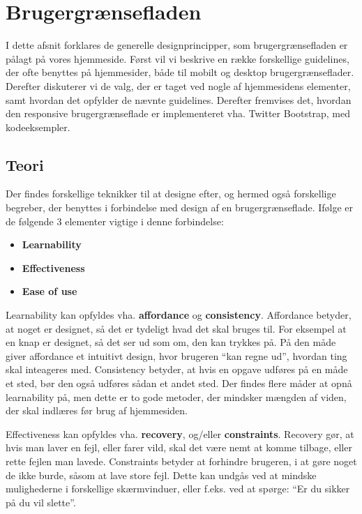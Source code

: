 \section{Brugergrænsefladen} \label{brugergraenseflade}
I dette afsnit forklares de generelle designprincipper, som brugergrænsefladen er pålagt på vores hjemmeside.
Først vil vi beskrive en række forskellige guidelines, der ofte benyttes på hjemmesider, både til mobilt og desktop brugergrænseflader.
Derefter diskuterer vi de valg, der er taget ved nogle af hjemmesidens elementer, samt hvordan det opfylder de nævnte guidelines.
Derefter fremvises det, hvordan den responsive brugergrænseflade er implementeret vha. Twitter Bootstrap, med kodeeksempler. 

\subsection{Teori}
Der findes forskellige teknikker til at designe efter, og hermed også forskellige begreber, der benyttes i forbindelse med design af en brugergrænseflade.
Ifølge \citep{DIS2014} er de følgende 3 elementer vigtige i denne forbindelse:
\begin{itemize}[nolistsep,noitemsep]
	\item \textbf{Learnability}
	\item \textbf{Effectiveness}
	\item \textbf{Ease of use}
\end{itemize}

Learnability kan opfyldes vha. \textbf{affordance} og \textbf{consistency}.
Affordance betyder, at noget er designet, så det er tydeligt hvad det skal bruges til.
For eksempel at en knap er designet, så det ser ud som om, den kan trykkes på. 
På den måde giver affordance et intuitivt design, hvor brugeren ``kan regne ud'', hvordan ting skal inteageres med.
Consistency betyder, at hvis en opgave udføres på en måde et sted, bør den også udføres sådan et andet sted.
Der findes flere måder at opnå learnability på, men dette er to gode metoder, der mindsker mængden af viden, der skal indlæres før brug af hjemmesiden.

Effectiveness kan opfyldes vha. \textbf{recovery}, og/eller \textbf{constraints}.
Recovery gør, at hvis man laver en fejl, eller farer vild, skal det være nemt at komme tilbage, eller rette fejlen man lavede.
Constraints betyder at forhindre brugeren, i at gøre noget de ikke burde, såsom at lave store fejl. 
Dette kan undgås ved at mindske mulighederne i forskellige skærmvinduer, eller f.eks. ved at spørge: ``Er du sikker på du vil slette''.

